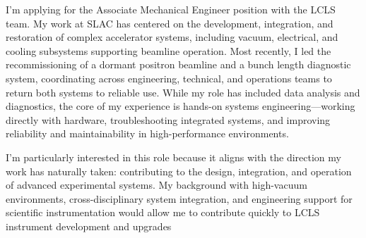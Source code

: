 



I’m applying for the Associate Mechanical Engineer position with the LCLS team. My work at SLAC has centered on the development, integration, and restoration of complex accelerator systems, including vacuum, electrical, and cooling subsystems supporting beamline operation. Most recently, I led the recommissioning of a dormant positron beamline and a bunch length diagnostic system, coordinating across engineering, technical, and operations teams to return both systems to reliable use. While my role has included data analysis and diagnostics, the core of my experience is hands-on systems engineering—working directly with hardware, troubleshooting integrated systems, and improving reliability and maintainability in high-performance environments.




I’m particularly interested in this role because it aligns with the direction my work has naturally taken: contributing to the design, integration, and operation of advanced experimental systems. My background with high-vacuum environments, cross-disciplinary system integration, and engineering support for scientific instrumentation would allow me to contribute quickly to LCLS instrument development and upgrades
